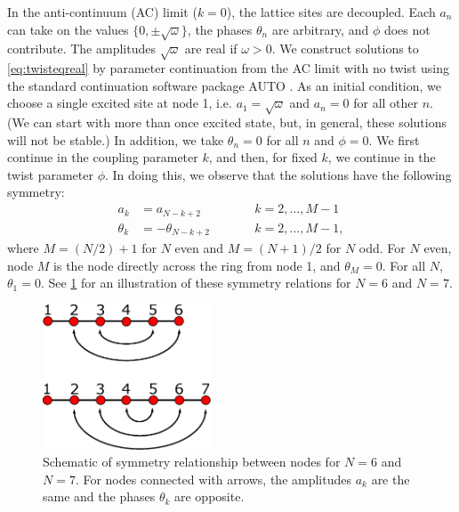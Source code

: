 \documentclass[reprint, amsmath,amssymb,aps,pra]{revtex4-2}
\renewcommand{\revised}[1]{ \textcolor{red}{#1} }
\begin{document}
In the anti-continuum (AC) limit ($k = 0$), the lattice sites are decoupled. Each $a_n$ can take on the values $\{0, \pm \sqrt{\omega} \}$, the phases $\theta_n$ are arbitrary, and $\phi$ does not contribute. The amplitudes $\sqrt{\omega}$ are real if  $\omega > 0$. We construct solutions to \cref{eq:twisteqreal} by parameter continuation from the AC limit with no twist using the standard continuation software package AUTO \revised{\cite{AUTO}}. As an initial condition, we choose a single excited site at node 1, i.e. $a_1 = \sqrt{\omega}$ and $a_n = 0$ for all other $n$. (We can start with more than once excited state, but, in general, these solutions will not be stable.) In addition, we take $\theta_n = 0$ for all $n$ and $\phi = 0$.  We first continue in the coupling parameter $k$, and then, for fixed $k$, we continue in the twist parameter $\phi$. In doing this, we observe that the solutions have the following symmetry:
\begin{equation}\label{eq:symm}
\begin{aligned}
a_k &= a_{N-k+2} && \qquad k = 2, \dots, M-1 \\
\theta_k &= -\theta_{N-k+2} && \qquad k = 2, \dots, M-1,
\end{aligned}
\end{equation}
where $M = (N/2)+1$ for $N$ even and $M = (N+1)/2$ for $N$ odd. For $N$ even, node $M$ is the node directly across the ring from node 1, and $\theta_M = 0$. For all $N$, $\theta_1 = 0$. See \cref{fig:symmetry1} for an illustration of these symmetry relations for $N = 6$ and $N = 7$. 
\begin{figure}
\begin{center}
\includegraphics[width=5cm]{symmetryvertical.eps}
\end{center}
\caption{Schematic of symmetry relationship between nodes for $N = 6$ and $N=7$. For nodes connected with arrows, the amplitudes $a_k$ are the same and the phases $\theta_k$ are opposite.}
\label{fig:symmetry1}
\end{figure}
\end{document}
